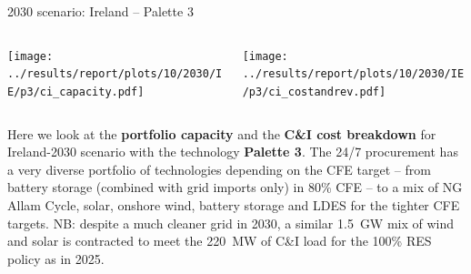 \begin{frame}{2030 scenario: Ireland -- Palette 3}

  {\footnotesize

  \begin{columns}
  \begin{column}{7cm}
  \centering
  \texttt{[image: ../results/report/plots/10/2030/IE/p3/ci\_capacity.pdf]}
  \end{column}

  \begin{column}{8cm}
  \centering
  \texttt{[image: ../results/report/plots/10/2030/IE/p3/ci\_costandrev.pdf]}
  \end{column}

  \end{columns}

  \begin{columns}
  \begin{column}{15cm}
  Here we look at the {\bf portfolio capacity} 
  and the {\bf C\&I cost breakdown} for Ireland-2030 scenario with 
  the technology {\bf Palette 3}. The 24/7 procurement has a very \alert{diverse portfolio of technologies 
  depending on the CFE target} -- from battery storage 
  (combined with grid imports only) in 80\% CFE --
  to a mix of  NG Allam Cycle, solar, onshore wind, battery storage 
  and LDES for the tighter CFE targets.  NB: despite a much cleaner grid in 2030,
  a similar 1.5~GW mix of wind and solar is contracted to meet the 220~MW
  of C\&I load for the 100\% RES policy as in 2025.

  \end{column}
  \end{columns}
  }

\end{frame}



